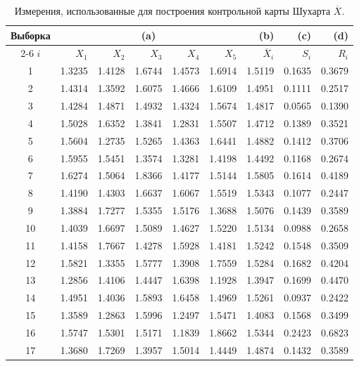 \begin{table}[htbp]
	\centering
	\caption{Измерения, использованные для построения контрольной карты Шухарта \(\overline{X}\).}
	\label{tab:3.13}
	\renewcommand{\arraystretch}{1.05} %
	\begin{tabular}{c *{5}{r} r r r}
		\toprule
		Выборка & \multicolumn{5}{c}{(a)} & (b) & (c) & (d) \\
		\cmidrule(lr){2-6}
		\(i\) & \(X_1\) & \(X_2\) & \(X_3\) & \(X_4\) & \(X_5\) & \(\overline{X}_i\) & \(S_i\) & \(R_i\) \\
		\midrule
		1  & 1.3235 & 1.4128 & 1.6744 & 1.4573 & 1.6914 & 1.5119 & 0.1635 & 0.3679 \\
		2  & 1.4314 & 1.3592 & 1.6075 & 1.4666 & 1.6109 & 1.4951 & 0.1111 & 0.2517 \\
		3  & 1.4284 & 1.4871 & 1.4932 & 1.4324 & 1.5674 & 1.4817 & 0.0565 & 0.1390 \\
		4  & 1.5028 & 1.6352 & 1.3841 & 1.2831 & 1.5507 & 1.4712 & 0.1389 & 0.3521 \\
		5  & 1.5604 & 1.2735 & 1.5265 & 1.4363 & 1.6441 & 1.4882 & 0.1412 & 0.3706 \\
		6  & 1.5955 & 1.5451 & 1.3574 & 1.3281 & 1.4198 & 1.4492 & 0.1168 & 0.2674 \\
		7  & 1.6274 & 1.5064 & 1.8366 & 1.4177 & 1.5144 & 1.5805 & 0.1614 & 0.4189 \\
		8  & 1.4190 & 1.4303 & 1.6637 & 1.6067 & 1.5519 & 1.5343 & 0.1077 & 0.2447 \\
		9  & 1.3884 & 1.7277 & 1.5355 & 1.5176 & 1.3688 & 1.5076 & 0.1439 & 0.3589 \\
		10 & 1.4039 & 1.6697 & 1.5089 & 1.4627 & 1.5220 & 1.5134 & 0.0988 & 0.2658 \\
		11 & 1.4158 & 1.7667 & 1.4278 & 1.5928 & 1.4181 & 1.5242 & 0.1548 & 0.3509 \\
		12 & 1.5821 & 1.3355 & 1.5777 & 1.3908 & 1.7559 & 1.5284 & 0.1682 & 0.4204 \\
		13 & 1.2856 & 1.4106 & 1.4447 & 1.6398 & 1.1928 & 1.3947 & 0.1699 & 0.4470 \\
		14 & 1.4951 & 1.4036 & 1.5893 & 1.6458 & 1.4969 & 1.5261 & 0.0937 & 0.2422 \\
		15 & 1.3589 & 1.2863 & 1.5996 & 1.2497 & 1.5471 & 1.4083 & 0.1568 & 0.3499 \\
		16 & 1.5747 & 1.5301 & 1.5171 & 1.1839 & 1.8662 & 1.5344 & 0.2423 & 0.6823 \\
		17 & 1.3680 & 1.7269 & 1.3957 & 1.5014 & 1.4449 & 1.4874 & 0.1432 & 0.3589 \\

\end{tabular}
\end{table}
